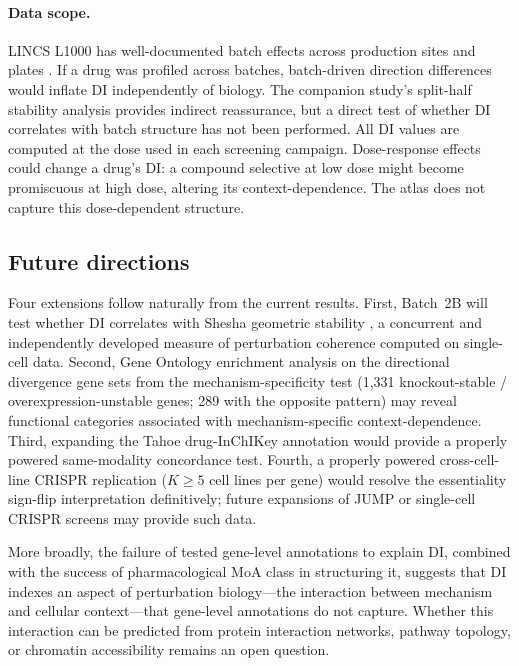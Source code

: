 \documentclass[11pt]{article}
\begin{document}
\paragraph{Data scope.}
LINCS L1000 has well-documented batch effects across production sites
and plates \citep{subramanian2017next}.  If a drug was profiled across
batches, batch-driven direction differences would inflate DI
independently of biology.  The companion study's split-half stability
analysis provides indirect reassurance, but a direct test of whether DI
correlates with batch structure has not been performed.
All DI values are computed at the dose used in each screening campaign.
Dose-response effects could change a drug's DI: a compound selective at
low dose might become promiscuous at high dose, altering its
context-dependence.  The atlas does not capture this dose-dependent
structure.

\subsection{Future directions}

Four extensions follow naturally from the current results.  First,
Batch~2B will test whether DI correlates with Shesha geometric
stability \citep{raju2026a, raju2026b}, a concurrent and independently
developed measure of perturbation coherence computed on single-cell
data.  Second, Gene Ontology enrichment analysis on the directional
divergence gene sets from the mechanism-specificity test (1{,}331 knockout-stable /
overexpression-unstable genes; 289 with the opposite pattern) may reveal
functional categories associated with mechanism-specific
context-dependence.  Third, expanding the Tahoe drug-InChIKey
annotation would provide a properly powered same-modality concordance
test.  Fourth, a properly powered
cross-cell-line CRISPR replication ($K \geq 5$ cell lines per gene)
would resolve the essentiality sign-flip interpretation definitively;
future expansions of JUMP or single-cell CRISPR screens
\citep{tahoe2025} may provide such data.

More broadly, the failure of tested gene-level annotations to
explain DI, combined with the success of pharmacological MoA class in
structuring it, suggests that DI indexes an aspect of perturbation
biology---the interaction between mechanism and cellular
context---that gene-level annotations do not capture.  Whether this
interaction can be predicted from protein interaction networks, pathway
topology, or chromatin accessibility remains an open question.
\end{document}
